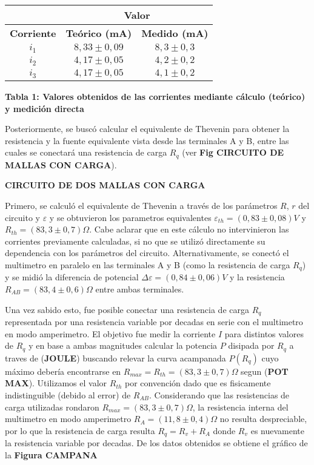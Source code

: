 \documentclass[11pt,a4paper]{article}
\begin{document}
\begin{center}
\begin{tabular}{||c|c|c||}
\hline
 & \multicolumn{2}{c||}{\textbf{Valor}} \\ \hline
\textbf{Corriente} & \textbf{Teórico (mA)} & \textbf{Medido (mA)} \\ \hline 
$i_1$ & $8,33\pm0,09$ & $8,3\pm0,3$ \\ \hline 
$i_2$ & $4,17\pm0,05$ & $4,2\pm0,2$ \\ \hline 
$i_3$ & $4,17\pm0,05$ & $4,1\pm0,2$ \\ \hline 
\end{tabular}

\textbf{Tabla 1: Valores obtenidos de las corrientes mediante cálculo (teórico) y medición directa}
\end{center}

Posteriormente, se buscó calcular el equivalente de Thevenin para obtener la resistencia y la fuente equivalente vista desde las terminales A y B, entre las cuales se conectará una resistencia de carga $R_q$ (ver \textbf{Fig CIRCUITO DE MALLAS CON CARGA}). 

\textbf{CIRCUITO DE DOS MALLAS CON CARGA}

Primero, se calculó el equivalente de Thevenin a través de los parámetros $R$, $r$ del circuito y $\varepsilon$ y se obtuvieron los parametros equivalentes $\varepsilon_{th} = (0,83\pm0,08)V$ y $R_{th} = (83,3 \pm 0,7) \Omega$. Cabe aclarar que en este cálculo no intervinieron las corrientes previamente calculadas, si no que se utilizó directamente su dependencia con los parámetros del circuito. Alternativamente, se conectó el multimetro en paralelo en las terminales A y B (como la resistencia de carga $R_q$) y se midió la diferencia de potencial $\Delta\varepsilon = (0,84 \pm 0,06)V$ y la resistencia $R_{AB} = (83,4\pm0,6)\Omega$ entre ambas terminales. 

Una vez sabido esto, fue posible conectar una resistencia de carga $R_q$ representada por una resistencia variable por decadas en serie con el multimetro en modo amperimetro. El objetivo fue medir la corriente $I$ para distintos valores de $R_q$ y en base a ambas magnitudes calcular la potencia $P$ disipada por $R_q$ a traves de (\textbf{JOULE}) buscando relevar la curva acampanada $P(R_q)$ cuyo máximo debería encontrarse en $R_{max} = R_{th} = (83,3\pm0,7)\Omega$ segun (\textbf{POT MAX}). Utilizamos el valor $R_{th}$ por convención dado que es fisicamente indistinguible (debido al error) de $R_{AB}$. Considerando que las resistencias de carga utilizadas rondaron $R_{max} = (83,3\pm0,7)\Omega$, la resistencia interna del multimetro en modo amperimetro $R_{A} = (11,8 \pm 0,4) \Omega$ no resulta despreciable, por lo que la resistencia de carga resulta $R_q = R_v + R_A$ donde $R_v$ es nuevamente la resistencia variable por decadas. De los datos obtenidos se obtiene el gráfico de la \textbf{Figura CAMPANA}
\end{document}
